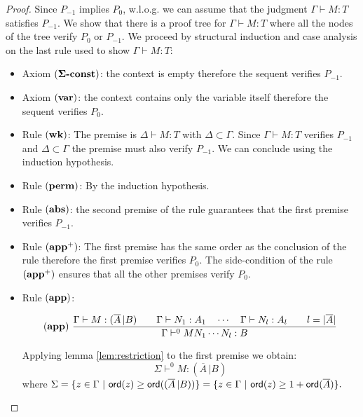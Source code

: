 \begin{proof}
Since $P_{-1}$ implies $P_0$, w.l.o.g. we can assume that the
judgment $\Gamma \vdash M : T$ satisfies $P_{-1}$. We show that
there is a proof tree for $\Gamma \vdash M : T$ where all the nodes
of the tree verify $P_0$ or $P_{-1}$. We proceed by structural
induction and case analysis on the last rule used to show $\Gamma
\vdash M : T$:
\begin{itemize}
\item Axiom $\mathbf{(\Sigma\mbox{\textbf{-const}})}$: the context is empty therefore the sequent verifies $P_{-1}$.

\item Axiom $\mathbf{(var)}$: the context contains only the variable itself therefore the sequent verifies $P_0$.

\item Rule $\mathbf{(wk)}$: The premise is $\Delta \vdash M : T$ with $\Delta \subset \Gamma$. Since
$\Gamma \vdash M : T$ verifies $P_{-1}$ and $\Delta \subset \Gamma$ the premise must also verify $P_{-1}$. We can conclude using the
induction hypothesis.

\item Rule $\mathbf{(perm)}$: By the induction hypothesis.


\item Rule $\mathbf{(abs)}$: the second premise of the rule guarantees that the first
premise verifies $P_{-1}$.

\item Rule $\mathbf{(app^+)}$: The first premise has the same order as the
conclusion of the rule therefore the first premise verifies
$P_0$. The side-condition of the rule $\mathbf{(app^+)}$ ensures that all the other premises verify $P_0$.

\item Rule $\mathbf{(app)}$:

$$ \mathbf{(app)} \
    \frac{\displaystyle 
        { \Gamma \vdash M : (\overline{A} \, | B)
        \qquad
        \Gamma \vdash N_1 : A_1 \quad \cdots \quad \Gamma \vdash N_{l} : A_l \qquad l = |\overline{A}|
        }
    }{
        \Gamma \vdash^0 M N_1 \cdots N_{l} : B
    }
$$

Applying lemma \ref{lem:restriction} to the first premise we obtain:
\begin{equation}
 \Sigma \vdash^0 M : (\overline{A} \, | B) \label{eq:seq1}
\end{equation}
where $\Sigma = \{ z \in \Gamma \ | \ {\sf ord}(z) \geq {\sf ord}((\overline{A} \, | B)) \} = \{ z \in \Gamma \ | \ {\sf ord}(z) \geq 1 + {\sf ord}(\overline{A}) \}.$


\end{itemize}
\end{proof}
